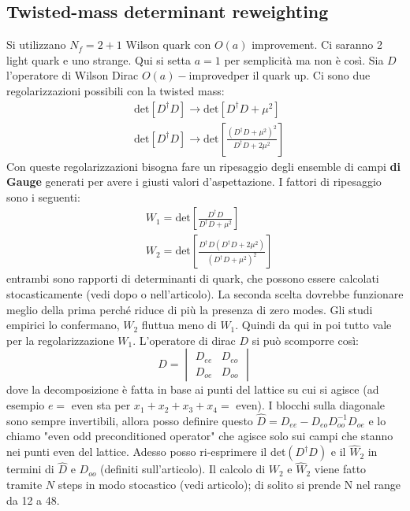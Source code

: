 \documentclass[12pt,a4paper,openright]{article}
\newcommand{\oai}{$O(a)-$improved}
\begin{document}
\subsection{Twisted-mass determinant reweighting}
Si utilizzano $N_f = 2+1$ Wilson quark con $O(a)$ improvement. Ci saranno 2 light quark e uno strange. Qui si setta $a=1$ per semplicità ma non è così.
\newline
Sia $D$ l'operatore di Wilson Dirac \oai per il quark up. Ci sono due regolarizzazioni possibili con la twisted mass:
\begin{equation*}
  \begin{aligned}
    & \text{det}\left[D^\dagger D\right] \rightarrow \text{det}\left[D^\dagger D +  \mu^2\right] \\
    & \text{det}\left[D^\dagger D\right] \rightarrow \text{det}\left[\frac{(D^\dagger D + \mu^2)^2}{D^\dagger D + 2\mu^2}\right]
  \end{aligned}
\end{equation*}
Con queste regolarizzazioni bisogna fare un ripesaggio degli ensemble di campi {\bf di Gauge } generati per avere i giusti valori d'aspettazione.
I fattori di ripesaggio sono i seguenti:
\begin{equation}
  \begin{aligned}
    & W_1 = \text{det}\left[\frac{D^\dagger D}{D^\dagger D + \mu^2}\right] \\
    & W_2 = \text{det}\left[\frac{D^\dagger D(D^\dagger D + 2\mu^2)}{(D^\dagger D + \mu^2)^2}\right]
  \end{aligned}
\end{equation}
entrambi sono rapporti di determinanti di quark, che possono essere calcolati stocasticamente (vedi dopo o nell'articolo).
La seconda scelta dovrebbe funzionare meglio della prima perché riduce di più la presenza di zero modes. Gli studi empirici lo confermano, $W_2$ fluttua meno di $W_1$.
Quindi da qui in poi tutto vale per la regolarizzazione $W_1$.
\newline
L'operatore di dirac $D$ si può scomporre così:
\begin{equation*}
  D = \begin{vmatrix}
    D_{ee} & D_{eo} \\
    D_{oe} & D_{oo}
  \end{vmatrix}
\end{equation*}
dove la decomposizione è fatta in base ai punti del lattice su cui si agisce (ad esempio $e =$ even sta per $x_1 + x_2 + x_3 + x_4 = $ even).
I blocchi sulla diagonale sono sempre invertibili, allora posso definire questo $\hat D = D_{ee} - D_{eo}D_{oo}^{-1}D_{oe}$ e lo chiamo "even odd preconditioned operator" che agisce solo sui campi che stanno nei punti even del lattice.
Adesso posso ri-esprimere il det$(D^\dagger D)$ e il $\hat W_2$ in termini di $\hat D$ e $D_{oo}$ (definiti sull'articolo).
\newline
Il calcolo di $W_2$ e $\hat W_2$ viene fatto tramite $N$ steps in modo stocastico (vedi articolo); di solito si prende N nel range da 12 a 48.
\end{document}
